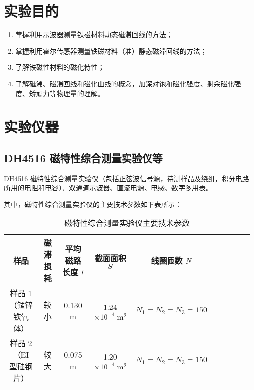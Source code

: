 \documentclass[UTF8]{article}
\theoremstyle{MyLineTheoremStyle} %
\theoremstyle{MyBlockTheoremStyle} %
\theoremstyle{MySubsubsectionStyle} %
\begin{document}
\newpage
{}






\section{实验目的}

\begin{enumerate}
\item 掌握利用示波器测量铁磁材料动态磁滞回线的方法；
\item 掌握利用霍尔传感器测量铁磁材料（准）静态磁滞回线的方法；
\item 了解铁磁性材料的磁化特性；
\item 了解磁滞、磁滞回线和磁化曲线的概念，加深对饱和磁化强度、剩余磁化强度、矫顽力等物理量的理解。
\end{enumerate}


\section{实验仪器}

\subsection{DH4516 磁特性综合测量实验仪等}

DH4516 磁特性综合测量实验仪（包括正弦波信号源，待测样品及绕组，积分电路所用的电阻和电容）、双通道示波器、直流电源、电感、数字多用表。

其中，磁特性综合测量实验仪的主要技术参数如下表所示：

\begin{table}[H]\centering
    \caption{磁特性综合测量实验仪主要技术参数}
    \label{磁特性综合测量实验仪主要技术参数}
\begin{tabular}{cccccccccc}\toprule
    样品 & 磁滞损耗 & 平均磁路长度 $l$ & 截面面积 $S$ & 线圈匝数 $N$  \\
    \midrule
    样品 1（锰锌铁氧体）  & 较小 &  0.130 m & 1.24 $\times 10^{-4}\  \mathrm{m^2}$ & $N_1 = N_2 = N_3 = 150$\\
    样品 2（EI 型硅钢片） & 较大 &  0.075 m & 1.20 $\times 10^{-4}\  \mathrm{m^2}$ & $N_1 = N_2 = N_3 = 150$\\
    \bottomrule
\end{tabular}
\end{table}
\end{document}
